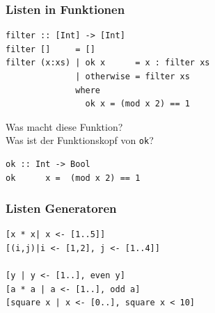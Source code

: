 \begin{frame}[fragile]
\frametitle{Listen in Funktionen}
\begin{lstlisting}
filter :: [Int] -> [Int]
filter []     = []
filter (x:xs) | ok x      = x : filter xs
              | otherwise = filter xs
              where
                ok x = (mod x 2) == 1
\end{lstlisting}
\vspace*{-3ex}
\begin{block}{\vspace*{-3ex}}
Was macht diese Funktion?\\
Was ist der Funktionskopf von \lstinline|ok|?\\
\end{block}
\pause
\begin{lstlisting}
ok :: Int -> Bool
ok      x =  (mod x 2) == 1
\end{lstlisting}
\end{frame}


\begin{frame}[fragile]
\frametitle{Listen Generatoren}
\begin{lstlisting}
[x * x| x <- [1..5]]
[(i,j)|i <- [1,2], j <- [1..4]]

[y | y <- [1..], even y]
[a * a | a <- [1..], odd a]
[square x | x <- [0..], square x < 10]
\end{lstlisting}
\begin{block}{\vspace*{-3ex}}
\begin{center}
\scalebox{0.7}{}
\end{center}
\end{block}
\end{frame}

